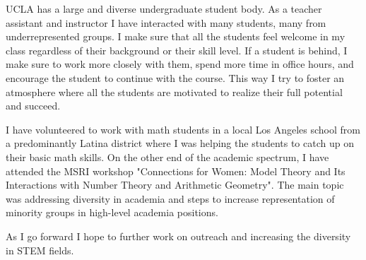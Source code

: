 UCLA has a large and diverse undergraduate student body. As a teacher assistant and instructor I have interacted with many students, many from underrepresented groups. I make sure that all the students feel welcome in my class regardless of their background or their skill level. If a student is behind, I make sure to work more closely with them, spend more time in office hours, and encourage the student to continue with the course. This way I try to foster an atmosphere where all the students are motivated to realize their full potential and succeed.

I have volunteered to work with math students in a local Los Angeles school from a predominantly Latina district where I was helping the students to catch up on their basic math skills. On the other end of the academic spectrum, I have attended the MSRI workshop "Connections for Women: Model Theory and Its Interactions with Number Theory and Arithmetic Geometry". The main topic was addressing diversity in academia and steps to increase representation of minority groups in high-level academia positions.

As I go forward I hope to further work on outreach and increasing the diversity in STEM fields.
